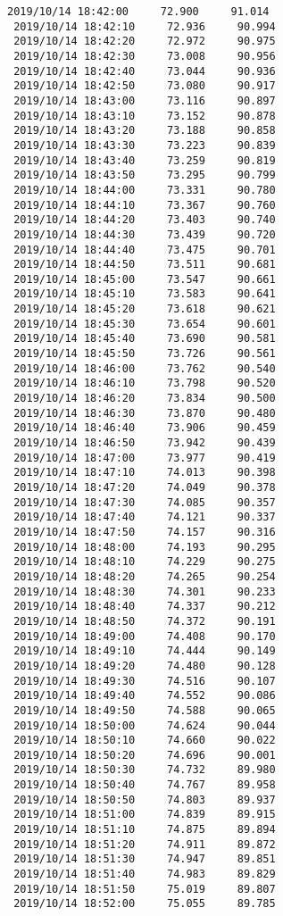 \documentclass[11pt]{article}
\begin{document}
\begin{Verbatim}[commandchars=\\\{\}]
 2019/10/14 18:42:00     72.900     91.014
 2019/10/14 18:42:10     72.936     90.994
 2019/10/14 18:42:20     72.972     90.975
 2019/10/14 18:42:30     73.008     90.956
 2019/10/14 18:42:40     73.044     90.936
 2019/10/14 18:42:50     73.080     90.917
 2019/10/14 18:43:00     73.116     90.897
 2019/10/14 18:43:10     73.152     90.878
 2019/10/14 18:43:20     73.188     90.858
 2019/10/14 18:43:30     73.223     90.839
 2019/10/14 18:43:40     73.259     90.819
 2019/10/14 18:43:50     73.295     90.799
 2019/10/14 18:44:00     73.331     90.780
 2019/10/14 18:44:10     73.367     90.760
 2019/10/14 18:44:20     73.403     90.740
 2019/10/14 18:44:30     73.439     90.720
 2019/10/14 18:44:40     73.475     90.701
 2019/10/14 18:44:50     73.511     90.681
 2019/10/14 18:45:00     73.547     90.661
 2019/10/14 18:45:10     73.583     90.641
 2019/10/14 18:45:20     73.618     90.621
 2019/10/14 18:45:30     73.654     90.601
 2019/10/14 18:45:40     73.690     90.581
 2019/10/14 18:45:50     73.726     90.561
 2019/10/14 18:46:00     73.762     90.540
 2019/10/14 18:46:10     73.798     90.520
 2019/10/14 18:46:20     73.834     90.500
 2019/10/14 18:46:30     73.870     90.480
 2019/10/14 18:46:40     73.906     90.459
 2019/10/14 18:46:50     73.942     90.439
 2019/10/14 18:47:00     73.977     90.419
 2019/10/14 18:47:10     74.013     90.398
 2019/10/14 18:47:20     74.049     90.378
 2019/10/14 18:47:30     74.085     90.357
 2019/10/14 18:47:40     74.121     90.337
 2019/10/14 18:47:50     74.157     90.316
 2019/10/14 18:48:00     74.193     90.295
 2019/10/14 18:48:10     74.229     90.275
 2019/10/14 18:48:20     74.265     90.254
 2019/10/14 18:48:30     74.301     90.233
 2019/10/14 18:48:40     74.337     90.212
 2019/10/14 18:48:50     74.372     90.191
 2019/10/14 18:49:00     74.408     90.170
 2019/10/14 18:49:10     74.444     90.149
 2019/10/14 18:49:20     74.480     90.128
 2019/10/14 18:49:30     74.516     90.107
 2019/10/14 18:49:40     74.552     90.086
 2019/10/14 18:49:50     74.588     90.065
 2019/10/14 18:50:00     74.624     90.044
 2019/10/14 18:50:10     74.660     90.022
 2019/10/14 18:50:20     74.696     90.001
 2019/10/14 18:50:30     74.732     89.980
 2019/10/14 18:50:40     74.767     89.958
 2019/10/14 18:50:50     74.803     89.937
 2019/10/14 18:51:00     74.839     89.915
 2019/10/14 18:51:10     74.875     89.894
 2019/10/14 18:51:20     74.911     89.872
 2019/10/14 18:51:30     74.947     89.851
 2019/10/14 18:51:40     74.983     89.829
 2019/10/14 18:51:50     75.019     89.807
 2019/10/14 18:52:00     75.055     89.785

\end{Verbatim}
\end{document}
